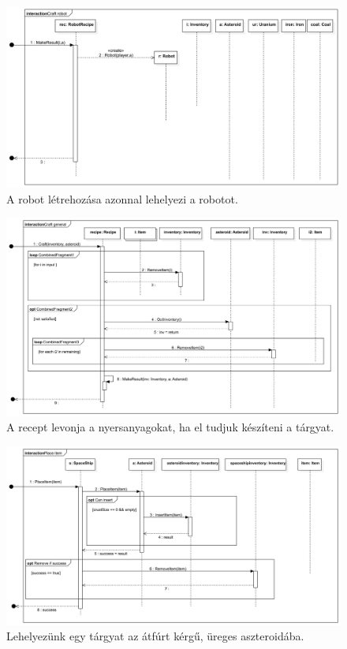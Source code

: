 \begin{figure}[H] 
\centering 
\includegraphics[width=1\textwidth]{docs/3_Project/svg/Design Model!Crafting!Craft robot!Craft robot_22.png} 
\caption{A robot létrehozása azonnal lehelyezi a robotot.} 
\end{figure} 

\begin{figure}[H] 
\centering 
\includegraphics[width=1\textwidth]{docs/3_Project/svg/Design Model!Crafting!Craft general!Craft general_23.png} 
\caption{A recept levonja a nyersanyagokat, ha el tudjuk készíteni a tárgyat.} 
\end{figure} 

\begin{figure}[H] 
\centering 
\includegraphics[width=1\textwidth]{docs/3_Project/svg/Design Model!Place resource in inventory!successful placement!Place item_24.png} 
\caption{Lehelyezünk egy tárgyat az átfúrt kérgű, üreges aszteroidába.} 
\end{figure} 

